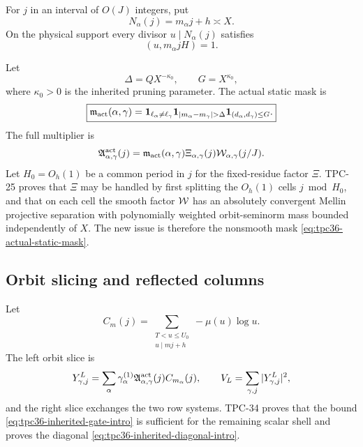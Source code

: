For \(j\) in an interval of \(O(J)\) integers, put
\begin{equation}
 N_\alpha(j)=m_\alpha j+h\asymp X.
 \label{eq:tpc36-target}
\end{equation}
On the physical support every divisor \(u\mid N_\alpha(j)\) satisfies
\begin{equation}
 (u,m_\alpha jH)=1.
 \label{eq:tpc36-target-primitivity}
\end{equation}

Let
\begin{equation}
 \Delta=QX^{-\kappa_0},\qquad G=X^{\kappa_0},
 \label{eq:tpc36-pruning-scales}
\end{equation}
where \(\kappa_0>0\) is the inherited pruning parameter.  The actual
static mask is
\begin{equation}
 \boxed{
 \mathfrak m_{\rm act}(\alpha,\gamma)
 =\one_{\ell_\alpha\ne\ell_\gamma}
  \one_{|m_\alpha-m_\gamma|>\Delta}
  \one_{(d_\alpha,d_\gamma)\le G}.}
 \label{eq:tpc36-actual-static-mask}
\end{equation}
The full multiplier is
\begin{equation}
 \mathfrak A_{\alpha,\gamma}^{\rm act}(j)
 =\mathfrak m_{\rm act}(\alpha,\gamma)
  \Xi_{\alpha,\gamma}(j)
  \mathcal W_{\alpha,\gamma}(j/J).
 \label{eq:tpc36-actual-joint-multiplier}
\end{equation}
Let \(H_0=O_h(1)\) be a common period in \(j\) for the fixed-residue
factor \(\Xi\).  TPC-25 proves that \(\Xi\) may be handled by first
splitting the \(O_h(1)\) cells \(j\bmod H_0\), and that on each cell the
smooth factor \(\mathcal W\) has an absolutely convergent Mellin projective
separation with polynomially weighted orbit-seminorm mass bounded
independently of \(X\).  The new issue is therefore the nonsmooth mask
\eqref{eq:tpc36-actual-static-mask}.

\subsection{Orbit slicing and reflected columns}

Let
\begin{equation}
 C_m(j)=\sum_{\substack{T<u\le U_0\\u\mid mj+h}}-\mu(u)\log u.
 \label{eq:tpc36-ultra-increment}
\end{equation}
The left orbit slice is
\begin{equation}
 Y_{\gamma,j}^{L}
 =\sum_\alpha\gamma_\alpha^{(1)}
  \mathfrak A_{\alpha,\gamma}^{\rm act}(j)C_{m_\alpha}(j),
 \qquad
 V_L=\sum_{\gamma,j}|Y_{\gamma,j}^{L}|^2,
 \label{eq:tpc36-left-orbit-slice}
\end{equation}
and the right slice exchanges the two row systems.  TPC-34 proves that
the bound \eqref{eq:tpc36-inherited-gate-intro} is sufficient for the
remaining scalar shell and proves the diagonal
\eqref{eq:tpc36-inherited-diagonal-intro}.

